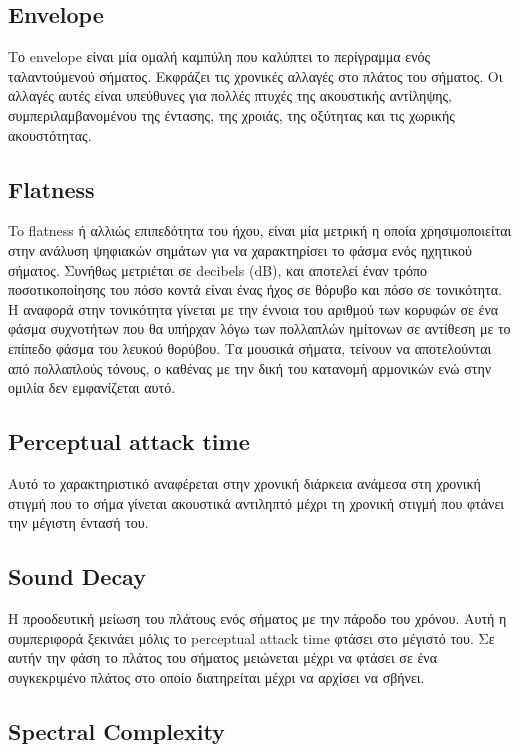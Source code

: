  \subsection{Envelope}

Το envelope είναι μία ομαλή καμπύλη που καλύπτει το περίγραμμα ενός ταλαντούμενού σήματος. Εκφράζει τις χρονικές αλλαγές στο πλάτος του σήματος. Οι αλλαγές αυτές είναι υπεύθυνες για πολλές πτυχές της ακουστικής αντίληψης, συμπεριλαμβανομένου της έντασης, της χροιάς, της οξύτητας και τις χωρικής ακουστότητας.

\subsection{Flatness}

To flatness ή αλλιώς επιπεδότητα του ήχου, είναι μία μετρική η οποία χρησιμοποιείται στην ανάλυση ψηφιακών σημάτων για να χαρακτηρίσει το φάσμα ενός ηχητικού σήματος. Συνήθως μετριέται σε decibels (dB), και αποτελεί έναν τρόπο ποσοτικοποίησης του πόσο κοντά είναι ένας ήχος σε θόρυβο και πόσο σε τονικότητα. Η αναφορά στην τονικότητα γίνεται με την έννοια του αριθμού των κορυφών σε ένα φάσμα συχνοτήτων που θα υπήρχαν λόγω των πολλαπλών ημίτονων σε αντίθεση με το επίπεδο φάσμα του λευκού θορύβου. Τα μουσικά σήματα, τείνουν να αποτελούνται από πολλαπλούς τόνους, ο καθένας με την δική του κατανομή αρμονικών ενώ στην ομιλία δεν εμφανίζεται αυτό.

\subsection{Perceptual attack time}

Αυτό το χαρακτηριστικό αναφέρεται στην χρονική διάρκεια ανάμεσα στη χρονική στιγμή που το σήμα γίνεται ακουστικά αντιληπτό μέχρι τη χρονική στιγμή που φτάνει την μέγιστη έντασή του.

\subsection{Sound Decay}

Η προοδευτική μείωση του πλάτους ενός σήματος με την πάροδο του χρόνου. Αυτή η συμπεριφορά ξεκινάει μόλις το perceptual attack time φτάσει στο μέγιστό του. Σε αυτήν την φάση το πλάτος του σήματος μειώνεται μέχρι να φτάσει σε ένα συγκεκριμένο πλάτος στο οποίο διατηρείται μέχρι να αρχίσει να σβήνει.

\subsection{Spectral Complexity}

